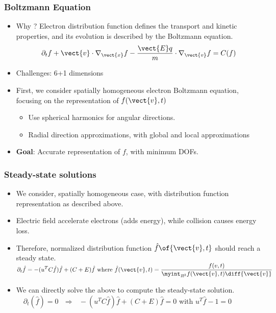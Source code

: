 \begin{frame}[fragile]
	\frametitle{Boltzmann Equation}
	\begin{itemize}
		\item Why ? Electron distribution function defines the transport and kinetic properties, and its evolution is described by the Boltzmann equation.
		\begin{align}
			\partial_t f + \vect{v}\cdot \nabla_{\vect{x}} f  - \frac{\vect{E} q}{m} \cdot \nabla_{\vect{v }}f = C(f)
		\end{align}
		\item Challenges: 6+1 dimensions
		\item First, we consider spatially homogeneous electron Boltzmann equation, focusing on the representation of $f(\vect{v},t)$
		\begin{itemize}
			\item Use spherical harmonics for angular directions. 
			\item Radial direction approximations, with global and local approximations
		\end{itemize}
		\item \textbf{Goal}: Accurate representation of $f$, with minimum DOFs. 
	\end{itemize}
\end{frame}

\begin{frame}
	\frametitle{Steady-state solutions}
	\begin{itemize}
		\item We consider, spatially homogeneous case, with distribution function representation as described above.  
		\item Electric field accelerate electrons (adds energy), while collision causes energy loss.
		\item Therefore, normalized distribution function $\hat{f}\of{\vect{v},t}$ should reach a steady state.  
		$
		\displaystyle
		\partial_t \hat{f} = -(u^T C \hat{f}) \hat{f} + (C+E)\hat{f} \text{ where } \hat{f}(\vect{v},t) = \frac{f(v,t)}{\myint_{R^3} f(\vect{v},t) \diff{\vect{v}}}
		$
		\item We can directly solve the above to compute the steady-state solution.
		$
		\displaystyle
		\quad
		\partial_t (\hat{f}) = 0 \ \ \  \Rightarrow \ \ \ -(u^T C \hat{f}) \hat{f} + (C+E)\hat{f} =0
		$ with $u^T \hat{f}-1=0$
	\end{itemize}
\end{frame}

